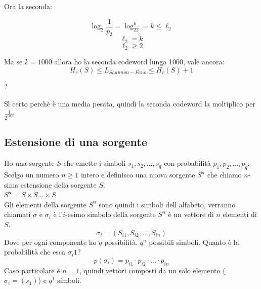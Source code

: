 Ora la seconda:

\begin{equation*}
\log_2\frac{1}{p_2} = \log_22^k = k \leq \ell_2
\end{equation*}
\begin{equation*}
\ell_2 = k
\end{equation*}
\begin{equation*}
\ell_2 \geq 2
\end{equation*}
 
Ma se $k=1000$ allora ho la seconda codeword lunga 1000, vale ancora:
\begin{equation*}
H_r(S) \leq L_{Shannon-Fano} \leq H_r(S) + 1
\end{equation*}
\begin{center}
?
\end{center}
Sì certo perchè è una media pesata, quindi la seconda codeword la moltiplico per $\frac{1}{2^{1000}}$


\subsection*{Estensione di una sorgente}

Ho una sorgente $S$ che emette i simboli $s_1, s_2, ..., s_q$ con probabilità $p_1, p_2, ..., p_q$.
Scelgo un numero $n \geq 1$ intero e definisco una nuova sorgente $S^n$ che chiamo $n$-sima estensione della sorgente $S$.\\
$S^n = S \times S ... \times S$\\
Gli elementi della sorgente $S^n$ sono quindi i simboli dell alfabeto, verranno chiamati $\sigma$ e $\sigma_i$ è l'$i$-esimo simbolo della sorgente $S^n$ è un vettore di $n$ elementi di $S$.
\begin{equation*}
\sigma_i=(S_{i1}, S_{i2}, ..., S_{in})
\end{equation*}
Dove per ogni componente ho $q$ possibilità. $q^n$ possibili simboli.
Quanto è la probabilità che esca $\sigma_i1$?
\begin{equation*}
p(\sigma_i) = p_{i1} \cdot p_{i2} \cdot ... \cdot p_{in}
\end{equation*}
Caso particolare è $n=1$, quindi vettori composti da un solo elemento ($\sigma_i = (s_1)$) e $q^1$ simboli.

